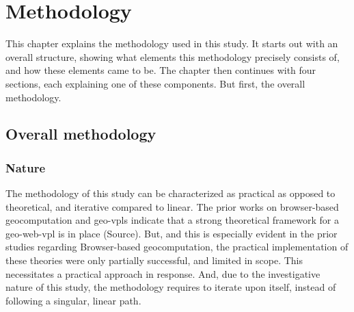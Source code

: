 \chapter{Methodology}
\label{chap:methodology}

This chapter explains the methodology used in this study. 
It starts out with an overall structure, showing what elements this methodology precisely consists of, and how these elements came to be. 
The chapter then continues with four sections, each explaining one of these components.
But first, the overall methodology.

\section{Overall methodology}

\subsection*{Nature}
The methodology of this study can be characterized as practical as opposed to theoretical, 
and iterative compared to linear. 
The prior works on browser-based geocomputation and geo-vpls indicate that a strong theoretical framework for a \ac{geo-web-vpl} is in place (Source). 
But, and this is especially evident in the prior studies regarding Browser-based geocomputation, the practical implementation of these theories were only partially successful, and limited in scope. 
This necessitates a practical approach in response. 
And, due to the investigative nature of this study, the methodology requires to iterate upon itself, instead of following a singular, linear path. 




